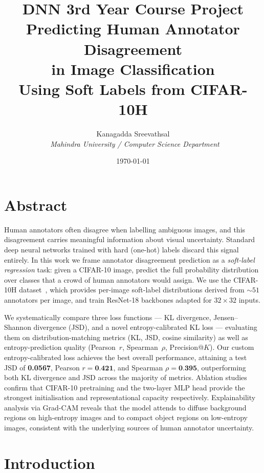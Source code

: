 \documentclass[11pt,a4paper]{article}
\title{%
  \vspace{-1cm}
  {\large DNN 3rd Year Course Project}\\[0.4em]
  {\LARGE\bfseries Predicting Human Annotator Disagreement\\
  in Image Classification}\\[0.4em]
  {\normalsize Using Soft Labels from CIFAR-10H}
}
\author{%
  {Kanagadda Sreevathsal}\\\
  \small\textit{Mahindra University / Computer Science Department}
}
\date{\today}
\begin{document}
\maketitle
\tableofcontents
\newpage

\section*{Abstract}

Human annotators often disagree when labelling ambiguous images, and this
disagreement carries meaningful information about visual uncertainty.
Standard deep neural networks trained with hard (one-hot) labels discard
this signal entirely.
In this work we frame annotator disagreement prediction as a
\emph{soft-label regression} task: given a CIFAR-10 image, predict the full
probability distribution over classes that a crowd of human annotators would
assign.
We use the CIFAR-10H dataset~\cite{peterson2019human}, which provides
per-image soft-label distributions derived from ${\sim}51$ annotators per
image, and train ResNet-18 backbones adapted for $32{\times}32$ inputs.

We systematically compare three loss functions — KL divergence,
Jensen--Shannon divergence (JSD), and a novel entropy-calibrated KL loss —
evaluating them on distribution-matching metrics (KL, JSD, cosine similarity)
as well as entropy-prediction quality (Pearson~$r$, Spearman~$\rho$,
Precision@$K$).
Our custom entropy-calibrated loss achieves the best overall performance,
attaining a test JSD of \textbf{0.0567}, Pearson $r = \textbf{0.421}$, and
Spearman $\rho = \textbf{0.395}$, outperforming both KL divergence and JSD
across the majority of metrics.
Ablation studies confirm that CIFAR-10 pretraining and the two-layer MLP head
provide the strongest initialisation and representational capacity
respectively.
Explainability analysis via Grad-CAM reveals that the model attends to
diffuse background regions on high-entropy images and to compact object
regions on low-entropy images, consistent with the underlying sources of
human annotator uncertainty.

\newpage

\section{Introduction}
\end{document}

